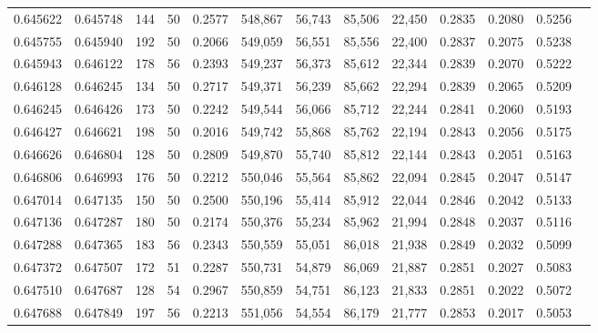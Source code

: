 \begin{tabular}{rrrrrrrrrrrrr}
0.645622 & 0.645748 &   144 &  50 &                                     0.2577 & 548,867 &  56,743 &  85,506 &  22,450 & 0.2835 & 0.2080 & 0.5256 \\
0.645755 & 0.645940 &   192 &  50 &                                     0.2066 & 549,059 &  56,551 &  85,556 &  22,400 & 0.2837 & 0.2075 & 0.5238 \\
0.645943 & 0.646122 &   178 &  56 &                                     0.2393 & 549,237 &  56,373 &  85,612 &  22,344 & 0.2839 & 0.2070 & 0.5222 \\
0.646128 & 0.646245 &   134 &  50 &                                     0.2717 & 549,371 &  56,239 &  85,662 &  22,294 & 0.2839 & 0.2065 & 0.5209 \\
0.646245 & 0.646426 &   173 &  50 &                                     0.2242 & 549,544 &  56,066 &  85,712 &  22,244 & 0.2841 & 0.2060 & 0.5193 \\
0.646427 & 0.646621 &   198 &  50 &                                     0.2016 & 549,742 &  55,868 &  85,762 &  22,194 & 0.2843 & 0.2056 & 0.5175 \\
0.646626 & 0.646804 &   128 &  50 &                                     0.2809 & 549,870 &  55,740 &  85,812 &  22,144 & 0.2843 & 0.2051 & 0.5163 \\
0.646806 & 0.646993 &   176 &  50 &                                     0.2212 & 550,046 &  55,564 &  85,862 &  22,094 & 0.2845 & 0.2047 & 0.5147 \\
0.647014 & 0.647135 &   150 &  50 &                                     0.2500 & 550,196 &  55,414 &  85,912 &  22,044 & 0.2846 & 0.2042 & 0.5133 \\
0.647136 & 0.647287 &   180 &  50 &                                     0.2174 & 550,376 &  55,234 &  85,962 &  21,994 & 0.2848 & 0.2037 & 0.5116 \\
0.647288 & 0.647365 &   183 &  56 &                                     0.2343 & 550,559 &  55,051 &  86,018 &  21,938 & 0.2849 & 0.2032 & 0.5099 \\
0.647372 & 0.647507 &   172 &  51 &                                     0.2287 & 550,731 &  54,879 &  86,069 &  21,887 & 0.2851 & 0.2027 & 0.5083 \\
0.647510 & 0.647687 &   128 &  54 &                                     0.2967 & 550,859 &  54,751 &  86,123 &  21,833 & 0.2851 & 0.2022 & 0.5072 \\
0.647688 & 0.647849 &   197 &  56 &                                     0.2213 & 551,056 &  54,554 &  86,179 &  21,777 & 0.2853 & 0.2017 & 0.5053 \\

\end{tabular}
